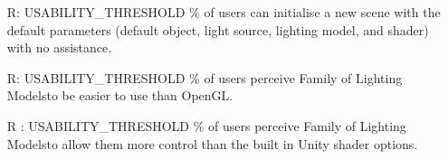 \documentclass[12pt, titlepage]{article}
\newcounter{reqnum} %
\newcommand{\famname}{Family of Lighting Models} %
\begin{document}
\begin{itemize}
	USABILITY\_THRESHOLD \% of users can change the parameters of the lighting 
	models and re-render an existing scene with no assistance.
	\item[R\refstepcounter{reqnum}\thereqnum \label{NFR-Usability-new}:] 
	USABILITY\_THRESHOLD \% of users can initialise a new scene with the 
	default parameters (default object, light source, lighting model, and 
	shader) with no assistance.
	\item[R\refstepcounter{reqnum}\thereqnum \label{NFR-Usability-perceived}:] 
	USABILITY\_THRESHOLD \% of users perceive \famname to be easier to use than 
	OpenGL.
	\item[R\refstepcounter{reqnum}\thereqnum 
	\label{NFR-Usability-control-perceived}:] 
	USABILITY\_THRESHOLD \% of users perceive \famname to allow them more 
	control than the built in Unity shader options.
\end{itemize}

\end{document}
